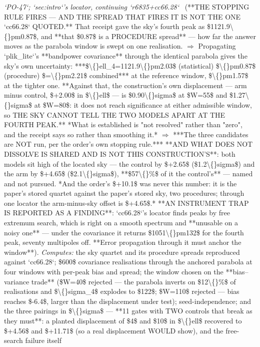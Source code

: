 \begin{description}
\textit{`PO-47`; `sec:intro`'s locator, continuing `r6835+cc66.28`} \ (**THE STOPPING RULE FIRES --- AND THE SPREAD THAT FIRES IT IS NOT THE ONE `cc66.28` QUOTED.** That receipt gave the sky's fourth peak as \$1121.9\textbackslash\{\}pm0.87\$, and **that \$0.87\$ is a PROCEDURE spread** --- how far the answer moves as the parabola window is swept on one realisation. \ensuremath{\Rightarrow} Propagating `plik\_lite`'s **bandpower covariance** through the identical parabola gives the sky's own uncertainty: ***\$\textbackslash\{\}ell\_4=1121.9\textbackslash\{\}pm2.03\$ (statistical) \$\textbackslash\{\}pm0.87\$ (procedure) \$=\textbackslash\{\}pm2.21\$ combined*** at the reference window, \$\textbackslash\{\}pm1.57\$ at the tighter one.  **Against that, the construction's own displacement --- arm minus control, \$+2.00\$ in \$\textbackslash\{\}ell\$ --- is \$0.90\textbackslash\{\}sigma\$ at \$W=55\$ and \$1.27\textbackslash\{\}sigma\$ at \$W=80\$: it does not reach significance at either admissible window, so THE SKY CANNOT TELL THE TWO MODELS APART AT THE FOURTH PEAK.** *What is established is "not resolved" rather than "zero", and the receipt says so rather than smoothing it.* \ensuremath{\Rightarrow} ***The three candidates are NOT run, per the order's own stopping rule.***  **AND WHAT DOES NOT DISSOLVE IS SHARED AND IS NOT THIS CONSTRUCTION'S**: both models sit high of the located sky --- the control by \$+2.65\$ (\$1.2\textbackslash\{\}sigma\$) and the arm by \$+4.65\$ (\$2.1\textbackslash\{\}sigma\$), **\$57\textbackslash\{\}\%\$ of it the control's** --- named and not pursued.  *And the order's \$+10.1\$ was never this number: it is the paper's stored quartet against the paper's stored sky, two procedures; through one locator the arm-minus-sky offset is \$+4.65\$.*  **AN INSTRUMENT TRAP IS REPORTED AS A FINDING**: `cc66.28`'s locator finds peaks by free extremum search, which is right on a smooth spectrum and **unusable on a noisy one** --- under the covariance it returns \$1051\textbackslash\{\}pm132\$ for the fourth peak, seventy multipoles off. **Error propagation through it must anchor the window**). 
\emph{Computes:} the sky quartet and its procedure spreads reproduced against `cc66.28`; \$600\$ covariance realisations through the anchored parabola at four windows with per-peak bias and spread; the window chosen on the **bias--variance trade** (\$W=40\$ rejected --- the parabola inverts on \$12\textbackslash\{\}\%\$ of realisations and \$\textbackslash\{\}sigma\_4\$ explodes to \$122\$; \$W=110\$ rejected --- bias reaches \$-6.4\$, larger than the displacement under test); seed-independence; and the three pairings in \$\textbackslash\{\}sigma\$ --- **11 gates with TWO controls that break as they must**: a planted displacement of \$4\$ and \$10\$ in \$\textbackslash\{\}ell\$ recovered to \$+4.56\$ and \$+11.71\$ (so a real displacement WOULD show), and the free-search failure itself

\end{description}

